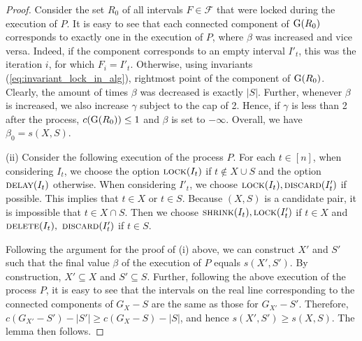 \begin{proof}
Consider the set $R_0$ of all intervals $F \in \mathcal{F}$ that were locked during the execution of $P$. 
It is easy to see that each connected component of $\operatorname{G}(R_0)$ corresponds to exactly one  in the execution of $P$, where $\beta$ was increased and vice versa. 
Indeed, if the component corresponds to an empty interval $I'_t$, this  was the iteration $i$, for which $F_i = I'_t$.
Otherwise, using invariants (\ref{eq:invariant_lock_in_alg}),  rightmost point of the component of $\operatorname{G}(R_0)$. 
Clearly, the amount of times $\beta$ was decreased is exactly $|S|$.
Further, whenever $\beta$ is increased, we also increase $\gamma$ subject to the cap of 2.
Hence, if $\gamma$ is less than 2 after the process, $c(\operatorname{G}(R_0)) \leq  1$ and $\beta$ is set to $-\infty$. 
Overall, we have $\beta_0 = s(X, S)$. 

(ii) Consider the following execution of the process $P$.
For each $t \in [n]$, when considering $I_t$, we choose the option $\textsc{lock}(I_t)$ if $t \notin X \cup S$ and the option  $\textsc{delay}(I_t)$ otherwise.
When considering $I'_t$, we choose $\textsc{lock}(I_t), \textsc{discard}(I'_t)$ if possible.
   This implies that $t \in X$ or $t \in S$.
Because $(X,S)$ is a candidate pair, it is impossible that $t \in X \cap S$.
Then we choose $\textsc{shrink}(I_t), \textsc{lock}(I'_t)$ if $t \in X$ and $\textsc{delete}(I_t),$ $\textsc{discard}(I'_t)$ if $t \in S$.

Following the argument for the proof of (i) above, we can construct $X'$ and $S'$ such that the final value $\beta$ of the execution of $P$ equals $s(X',S')$. 
By construction, $X' \subseteq X$ and $S' \subseteq S$.
Further, following the above execution of the process $P$, it is easy to see that the intervals on the real line corresponding to the connected components of $G_X - S$ are the same as those for $G_{X'} - S'$.
Therefore, $c(G_{X'} - S') - |S'| \geq c(G_{X} - S) - |S|$, and hence $s(X',S') \geq s(X,S)$.
The lemma then follows.
 
\end{proof}

